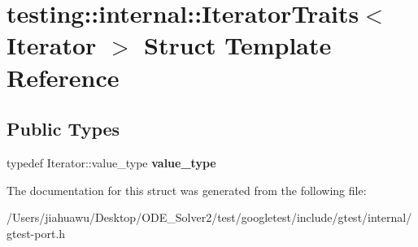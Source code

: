\hypertarget{structtesting_1_1internal_1_1_iterator_traits}{}\section{testing\+:\+:internal\+:\+:Iterator\+Traits$<$ Iterator $>$ Struct Template Reference}
\label{structtesting_1_1internal_1_1_iterator_traits}
\subsection*{Public Types}
\begin{DoxyCompactItemize}
\item 
\mbox{\label{structtesting_1_1internal_1_1_iterator_traits_a29de4320a9c53ce438d3561b94e515bb}} 
typedef Iterator\+::value\+\_\+type {\bfseries value\+\_\+type}
\end{DoxyCompactItemize}


The documentation for this struct was generated from the following file\+:\begin{DoxyCompactItemize}
\item 
/\+Users/jiahuawu/\+Desktop/\+O\+D\+E\+\_\+\+Solver2/test/googletest/include/gtest/internal/gtest-\/port.\+h\end{DoxyCompactItemize}
